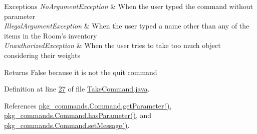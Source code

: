 \begin{DoxyExceptions}{Exceptions}
{\em No\-Argument\-Exception} & When the user typed the command without parameter \\
\hline
{\em Illegal\-Argument\-Exception} & When the user typed a name other than any of the items in the Room's inventory \\
\hline
{\em Unauthorized\-Exception} & When the user tries to take too much object considering their weights \\
\hline
\end{DoxyExceptions}
\begin{DoxyReturn}{Returns}
False because it is not the quit command 
\end{DoxyReturn}


Definition at line \hyperlink{TakeCommand_8java_source_l00027}{27} of file \hyperlink{TakeCommand_8java_source}{Take\-Command.\-java}.



References \hyperlink{Command_8java_source_l00041}{pkg\-\_\-commands.\-Command.\-get\-Parameter()}, \hyperlink{Command_8java_source_l00073}{pkg\-\_\-commands.\-Command.\-has\-Parameter()}, and \hyperlink{Command_8java_source_l00089}{pkg\-\_\-commands.\-Command.\-set\-Message()}.


